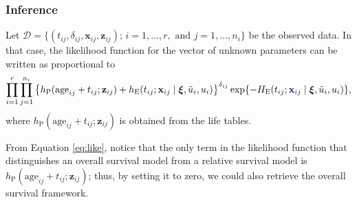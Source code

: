 \documentclass[10pt, aspectratio = 169, handout]{beamer} %
\let\oldtextbf\textbf
\renewcommand\textbf[1]{\textcolor{titles}{\oldtextbf{#1}}}
\begin{document}
    \begin{frame}[t]
    	\frametitle{Inference}
    	\justifying

        Let $\mathcal{D} = \{(t_{ij}, \delta_{ij}, \mathbf{x}_{ij}, \mathbf{z}_{ij}); \, i = 1, \ldots, r, \text{ and } j = 1, \ldots, n_i\}$ be the observed data. In that case, the likelihood function for the vector of unknown parameters can be written as proportional to
        \begin{align} \label{eq:like}
            \prod_{i = 1}^{r}\prod_{j = 1}^{n_i} \left\{h_{\text{P}}(\text{age}_{ij} + t_{ij}; \mathbf{z}_{ij}) + h_{\text{E}}(t_{ij}; \mathbf{x}_{ij} \mid  \boldsymbol{\xi}, \tilde{u}_i, u_i)\right\}^{\delta_{ij}} \exp\{-H_{\text{E}}(t_{ij}; \textbf{x}_{ij} \mid  \boldsymbol{\xi}, \tilde{u}_i, u_i)\},
        \end{align}
        where $h_{\text{P}}(\text{age}_{ij} + t_{ij}; \mathbf{z}_{ij})$ is obtained from the life tables. 

        \vspace{5pt}
        
        From \textcolor{titles}{Equation \eqref{eq:like}}, notice that the only term in the likelihood function that distinguishes an overall survival model from a relative survival model is $h_{\text{P}}(\text{age}_{ij} + t_{ij}; \mathbf{z}_{ij})$; thus, by setting it to zero, we could also retrieve the overall survival framework.
            
    \end{frame}
\end{document}
